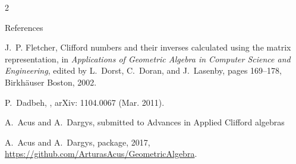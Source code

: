\documentclass[a4paper,10pt,lithuanian]{article}
\begin{document}
\begin{multicols*}{2}
\begin{thebibliography}{References}

J.~P. Fletcher,
\newblock Clifford numbers and their inverses calculated using the matrix
  representation,
\newblock in {\em Applications of Geometric Algebra in Computer Science and
  Engineering}, edited by L.~Dorst, C.~Doran, and J.~Lasenby, pages 169--178,
  Birkh{\"a}user Boston, 2002.

P.~{Dadbeh},
,
\newblock arXiv: 1104.0067  (Mar. 2011).

A.~Acus and A.~Dargys,
\newblock submitted to Advances in Applied Clifford algebras

A.~Acus and A.~Dargys,
 package, 2017,\newline
 \url{https://github.com/ArturasAcus/GeometricAlgebra}.

\end{thebibliography}



\end{multicols*}
\end{document}
